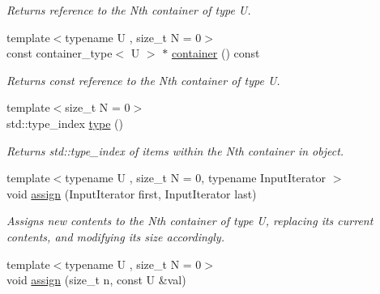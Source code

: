\begin{DoxyCompactItemize}
\begin{DoxyCompactList}\small\item\em Returns reference to the Nth container of type U. \end{DoxyCompactList}\item 
\hypertarget{classheterogeneous_1_1heterodeque_3_01_t_00_01_types_8_8_8_4_afda534396ddd049f0eaf30e65d9c96e0}{}{\footnotesize template$<$typename U , size\+\_\+t N = 0$>$ }\\const container\+\_\+type$<$ U $>$ $\ast$ \hyperlink{classheterogeneous_1_1heterodeque_3_01_t_00_01_types_8_8_8_4_afda534396ddd049f0eaf30e65d9c96e0}{container} () const \label{classheterogeneous_1_1heterodeque_3_01_t_00_01_types_8_8_8_4_afda534396ddd049f0eaf30e65d9c96e0}

\begin{DoxyCompactList}\small\item\em Returns const reference to the Nth container of type U. \end{DoxyCompactList}\item 
\hypertarget{classheterogeneous_1_1heterodeque_3_01_t_00_01_types_8_8_8_4_a5f78bc3f70eb8ef49cc6de984ed4068f}{}{\footnotesize template$<$size\+\_\+t N = 0$>$ }\\std\+::type\+\_\+index \hyperlink{classheterogeneous_1_1heterodeque_3_01_t_00_01_types_8_8_8_4_a5f78bc3f70eb8ef49cc6de984ed4068f}{type} ()\label{classheterogeneous_1_1heterodeque_3_01_t_00_01_types_8_8_8_4_a5f78bc3f70eb8ef49cc6de984ed4068f}

\begin{DoxyCompactList}\small\item\em Returns std\+::type\+\_\+index of items within the Nth container in object. \end{DoxyCompactList}\item 
\hypertarget{classheterogeneous_1_1heterodeque_3_01_t_00_01_types_8_8_8_4_a2250855e6336cd562cf8aa4ce52a848a}{}{\footnotesize template$<$typename U , size\+\_\+t N = 0, typename Input\+Iterator $>$ }\\void \hyperlink{classheterogeneous_1_1heterodeque_3_01_t_00_01_types_8_8_8_4_a2250855e6336cd562cf8aa4ce52a848a}{assign} (Input\+Iterator first, Input\+Iterator last)\label{classheterogeneous_1_1heterodeque_3_01_t_00_01_types_8_8_8_4_a2250855e6336cd562cf8aa4ce52a848a}

\begin{DoxyCompactList}\small\item\em Assigns new contents to the Nth container of type U, replacing its current contents, and modifying its size accordingly. \end{DoxyCompactList}\item 
\hypertarget{classheterogeneous_1_1heterodeque_3_01_t_00_01_types_8_8_8_4_a1b4bd57d2d9f66a990ee7d0df9053376}{}{\footnotesize template$<$typename U , size\+\_\+t N = 0$>$ }\\void \hyperlink{classheterogeneous_1_1heterodeque_3_01_t_00_01_types_8_8_8_4_a1b4bd57d2d9f66a990ee7d0df9053376}{assign} (size\+\_\+t n, const U \&val)\label{classheterogeneous_1_1heterodeque_3_01_t_00_01_types_8_8_8_4_a1b4bd57d2d9f66a990ee7d0df9053376}


\end{DoxyCompactItemize}
